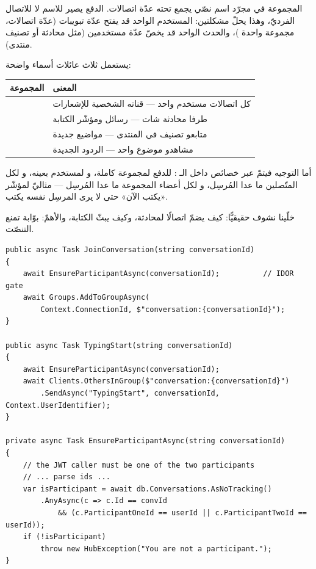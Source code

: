 المجموعة  في  مجرّد اسم نصّي يجمع تحته عدّة اتصالات.
الدفع يصير للاسم لا للاتصال الفرديّ، وهذا يحلّ مشكلتين: المستخدم الواحد قد يفتح
عدّة تبويبات (عدّة اتصالات، مجموعة واحدة )، والحدث الواحد قد
يخصّ عدّة مستخدمين (مثل محادثة أو تصنيف منتدى).

 يستعمل ثلاث عائلات أسماء واضحة:

\begin{center}
\begin{tabular}{L{4cm} L{8cm}}
\toprule
{\color{spPrimary}المجموعة} & {\color{spPrimary}المعنى} \\
\midrule
{} & كل اتصالات مستخدم واحد — قناته الشخصية للإشعارات \\
 & طرفا محادثة شات — رسائل ومؤشّر الكتابة \\
 & متابعو تصنيف في المنتدى — مواضيع جديدة \\
 & مشاهدو موضوع واحد — الردود الجديدة \\
\bottomrule
\end{tabular}
\end{center}

أما التوجيه فيتمّ عبر خصائص  داخل الـ :
 للدفع لمجموعة كاملة، و لمستخدم
بعينه، و لكل المتّصلين ما عدا المُرسِل، و
 لكل أعضاء المجموعة ما عدا المُرسِل — مثاليّ
لمؤشّر «يكتب الآن» حتى لا يرى المرسِل نفسه يكتب.

خلّينا نشوف  حقيقيًّا: كيف يضمّ اتصالًا لمحادثة، وكيف يبثّ الكتابة،
والأهمّ: بوّابة تمنع التنصّت.

\begin{english}
\begin{lstlisting}[language={[Sharp]C}]
public async Task JoinConversation(string conversationId)
{
    await EnsureParticipantAsync(conversationId);          // IDOR gate
    await Groups.AddToGroupAsync(
        Context.ConnectionId, $"conversation:{conversationId}");
}

public async Task TypingStart(string conversationId)
{
    await EnsureParticipantAsync(conversationId);
    await Clients.OthersInGroup($"conversation:{conversationId}")
        .SendAsync("TypingStart", conversationId, Context.UserIdentifier);
}

private async Task EnsureParticipantAsync(string conversationId)
{
    // the JWT caller must be one of the two participants
    // ... parse ids ...
    var isParticipant = await db.Conversations.AsNoTracking()
        .AnyAsync(c => c.Id == convId
            && (c.ParticipantOneId == userId || c.ParticipantTwoId == userId));
    if (!isParticipant)
        throw new HubException("You are not a participant.");
}
\end{lstlisting}
\end{english}

